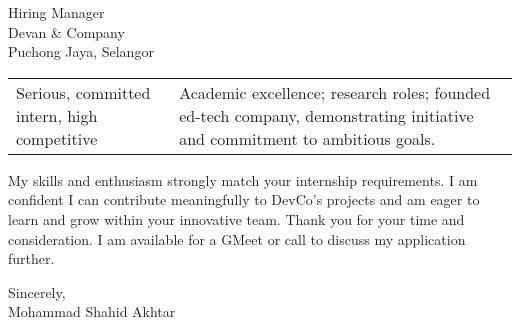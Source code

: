 \documentclass[10.5pt]{letter}
\begin{document}
\begin{letter}{Hiring Manager\\
Devan \& Company\\
Puchong Jaya, Selangor}
\begin{tabularx}{\textwidth}{@{}p{}X@{}}
Serious, committed intern, high competitive & Academic excellence; research roles; founded ed-tech company, demonstrating initiative and commitment to ambitious goals. \\

\end{tabularx}

\vspace{0.5cm}
My skills and enthusiasm strongly match your internship requirements. I am confident I can contribute meaningfully to DevCo's projects and am eager to learn and grow within your innovative team. Thank you for your time and consideration. I am available for a GMeet or call to discuss my application further.

\vspace{0.3cm}
\begin{flushleft}
Sincerely,\\
[2ex]
Mohammad Shahid Akhtar
\end{flushleft}

\end{letter}
\end{document}
